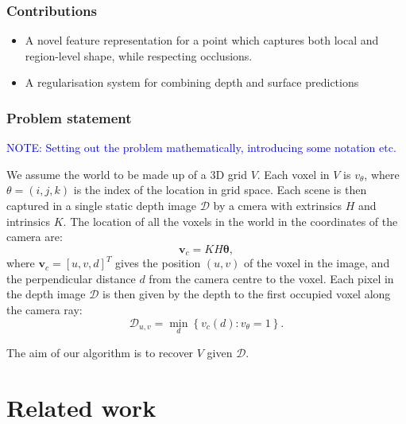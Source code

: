 \documentclass[10pt,twocolumn,letterpaper]{article}
\makeatletter
\renewcommand*{\eg}{e.g.\@\xspace}
\newcommand{\rgbdimage}{\mathcal{D}}
\newcommand{\note}[1]{\textcolor{blue}{NOTE: #1}}
\makeatother
\begin{document}
\subsubsection{Contributions}
\begin{itemize}
\item A novel feature representation for a point which captures both local and region-level shape, while respecting occlusions.
\item A regularisation system for combining depth and surface predictions
\end{itemize}

\subsubsection{Problem statement}

\note{Setting out the problem mathematically, introducing some notation etc.}


We assume the world to be made up of a 3D grid $V$.
Each voxel in $V$ is $v_\theta$, where $\theta=(i,j,k)$ is the index of the location in grid space.
Each scene is then captured in a single static depth image $\rgbdimage$ by a cmera with extrinsics $H$ and intrinsics $K$. The location of all the voxels in the world in the coordinates of the camera are:
$$
\mathbf{v}_c = K H \mathbf{\theta},
$$
where $\mathbf{v}_c = [u, v, d]^{T}$ gives the position $(u,v)$ of the voxel in the image, and the  perpendicular distance $d$ from the camera centre to the voxel.
Each pixel in the depth image $\rgbdimage$ is then given by the depth to the first occupied voxel along the camera ray:
$$
\rgbdimage_{u,v} = \min_d \left\{ v_c(d) : v_\theta = 1 \right\}.
$$

The aim of our algorithm is to recover $V$ given $\rgbdimage$.




\section{Related work}

\end{document}
